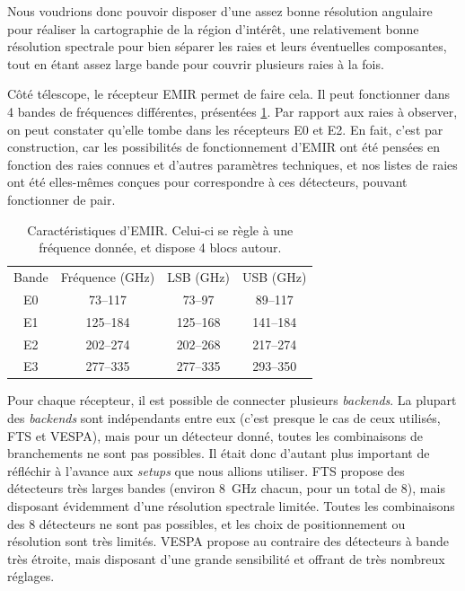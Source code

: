 \documentclass[a4paper,10pt,french]{article}
\newcommand{\GHz}{\si{\giga\hertz}}
\begin{document}
Nous voudrions donc pouvoir disposer d’une assez bonne résolution angulaire
pour réaliser la cartographie de la région d’intérêt, une relativement bonne
résolution spectrale pour bien séparer les raies et leurs éventuelles
composantes, tout en étant assez large bande pour couvrir plusieurs raies à la
fois.

Côté télescope, le récepteur EMIR permet de faire cela. Il peut fonctionner
dans 4 bandes de fréquences différentes, présentées \cref{tab:emir}. Par
rapport aux raies à observer, on peut constater qu’elle tombe dans les
récepteurs E0 et E2. En fait, c’est par construction, car les possibilités de
fonctionnement d’EMIR ont été pensées en fonction des raies connues et d’autres
paramètres techniques, et nos listes de raies ont été elles-mêmes conçues pour
correspondre à ces détecteurs, pouvant fonctionner de pair.

\begin{table}[ht]
    \centering
    \begin{tabular}{cccc}
        \hline
        \hline
        Bande & Fréquence (\GHz)    & LSB (\GHz)          & USB (\GHz)          \\
        E0    & \numrange{ 73}{117} & \numrange{ 73}{97 } & \numrange{ 89}{117} \\
        E1    & \numrange{125}{184} & \numrange{125}{168} & \numrange{141}{184} \\
        E2    & \numrange{202}{274} & \numrange{202}{268} & \numrange{217}{274} \\
        E3    & \numrange{277}{335} & \numrange{277}{335} & \numrange{293}{350} \\
        \hline
    \end{tabular}
    \caption{Caractéristiques d’EMIR. Celui-ci se règle à une fréquence donnée, et
    dispose 4 blocs autour.}
    \label{tab:emir}
\end{table}

Pour chaque récepteur, il est possible de connecter plusieurs
\textit{backends}. La plupart des \textit{backends} sont indépendants entre eux
(c’est presque le cas de ceux utilisés, FTS et VESPA), mais pour un détecteur
donné, toutes les combinaisons de branchements ne sont pas possibles. Il était
donc d’autant plus important de réfléchir à l’avance aux \textit{setups} que
nous allions utiliser. FTS propose des détecteurs très larges bandes (environ
\SI{8}{\giga\hertz} chacun, pour un total de 8), mais disposant évidemment
d’une résolution spectrale limitée. Toutes les combinaisons des 8 détecteurs ne
sont pas possibles, et les choix de positionnement ou résolution sont très
limités. VESPA propose au contraire des détecteurs à bande très étroite, mais
disposant d’une grande sensibilité et offrant de très nombreux réglages.
\end{document}
